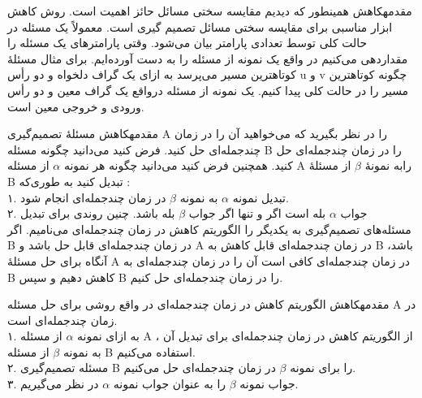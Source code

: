 \begin{itemframe-s}{مقدمه}{کاهش}
\itm
همینطور که دیدیم مقایسه سختی مسائل حائز اهمیت است. روش کاهش ابزار مناسبی برای مقایسه سختی مسائل تصمیم گیری است.
\itm
معمولاً یک مسئله در حالت کلی توسط تعدادی پارامتر بیان می‌شود. وقتی پارامترهای یک مسئله را مقداردهی می‌کنیم در واقع یک نمونه
از مسئله را به دست آورده‌ایم.
\itm
برای مثال مسئلهٔ کوتاهترین مسیر می‌پرسد به ازای یک گراف دلخواه و دو رأس u و v چگونه کوتاهترین مسیر را در حالت کلی پیدا کنیم. یک نمونه از مسئله درواقع یک گراف معین و دو رأس ورودی و خروجی معین است.
\end{itemframe-s}


\begin{itemframe-s}{مقدمه}{کاهش}
\itm
مسئلهٔ تصمیم‌گیری A را در نظر بگیرید که می‌خواهید آن را در زمان چندجمله‌ای حل کنید.
\itm
فرض کنید می‌دانید چگونه مسئله B را در زمان چند‌جمله‌ای حل کنید.
\itm
همچنین فرض کنید می‌دانید چگونه هر نمونه
$\alpha$
از مسئله A رابه نمونهٔ
$\beta$
از مسئلهٔ B تبدیل کنید به طوری‌که :\\
۱. تبدیل نمونه
$\alpha$
به نمونه
$\beta$
در زمان چند‌جمله‌ای انجام شود.\\
۲. جواب
$\alpha$
بله است اگر و تنها اگر جواب
$\beta$
بله باشد.
\itm
چنین روندی برای تبدیل مسئله‌های تصمیم‌گیری به یکدیگر را الگوریتم کاهش در زمان چندجمله‌ای
می‌نامیم.
\itm
اگر B در زمان چندجمله‌ای قابل حل باشد و A در زمان چندجمله‌ای قابل کاهش به B باشد، آنگاه برای حل مسئلهٔ A در زمان چندجمله‌ای کافی است آن را در زمان چندجمله‌ای به B کاهش دهیم و سپس B را در زمان چندجمله‌ای حل کنیم.
\end{itemframe-s}


\begin{itemframe-s}{مقدمه}{کاهش}
\itm
الگوریتم کاهش در زمان چندجمله‌ای در واقع روشی برای حل مسئله A در زمان چند‌جمله‌ای است.\\
۱. به ازای نمونه
$\alpha$
از مسئله A ، از الگوریتم کاهش در زمان چندجمله‌ای برای تبدیل آن به نمونه
$\beta$
از مسئله B استفاده می‌کنیم.\\
۲. مسئله تصمیم‌گیری B را برای نمونه
$\beta$
در زمان چندجمله‌ای حل می‌کنیم.\\
۳. جواب نمونه
$\beta$
را به عنوان جواب نمونه
$\alpha$
در نظر می‌گیریم.
\end{itemframe-s}


